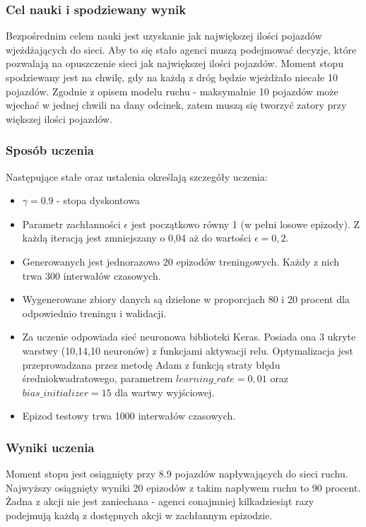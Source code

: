 \documentclass[12pt]{book}
\theoremstyle{plain}
\begin{document}
\subsubsection*{Cel nauki i spodziewany wynik}
Bezpośrednim celem nauki jest uzyskanie jak największej ilości pojazdów wjeżdżających do sieci. Aby to się stało agenci muszą podejmować decyzje, które pozwalają na opuszczenie sieci jak największej ilości pojazdów. Moment stopu spodziewany jest na chwilę, gdy na każdą z dróg będzie wjeżdżało niecałe 10 pojazdów. Zgodnie z opisem modelu ruchu - maksymalnie 10 pojazdów może wjechać w jednej chwili na dany odcinek, zatem muszą się tworzyć zatory przy większej ilości pojazdów.

\subsubsection*{Sposób uczenia}
Następujące stałe oraz ustalenia określają szczegóły uczenia:
\begin{itemize}
	\item $\gamma = 0.9$ - stopa dyskontowa
	\item Parametr zachłanności $\epsilon$ jest początkowo równy 1 (w pełni losowe epizody). Z każdą iteracją jest zmniejszany o 0,04 aż do wartości $\epsilon=0,2$.
	\item Generowanych jest jednorazowo 20 epizodów treningowych. Każdy z nich trwa 300 interwałów czasowych.
	\item Wygenerowane zbiory danych są dzielone w proporcjach 80 i 20 procent dla odpowiednio treningu i walidacji.
	\item Za uczenie odpowiada sieć neuronowa biblioteki Keras. Posiada ona 3 ukryte warstwy (10,14,10 neuronów) z funkcjami aktywacji relu. Optymalizacja jest przeprowadzana przez metodę Adam z funkcją straty błędu średniokwadratowego, parametrem $learning\_rate = 0,01$ oraz $bias\_initializer=15$ dla wartwy wyjściowej. 
	\item Epizod testowy trwa 1000 interwałów czasowych.
\end{itemize}
\subsubsection{Wyniki uczenia}
Moment stopu jest osiągnięty przy 8.9 pojazdów napływających do sieci ruchu. Najwyższy osiągnięty wyniki 20 epizodów z takim napływem ruchu to 90 procent. Żadna z akcji nie jest zaniechana - agenci conajmniej kilkadziesiąt razy podejmują każdą z dostępnych akcji w zachłannym epizodzie.
\end{document}
